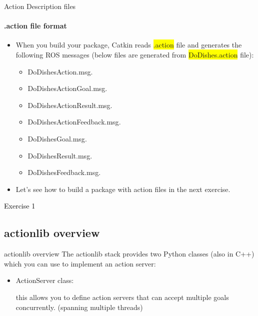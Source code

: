 \documentclass{beamer}
\begin{document}
\begin{frame}{Action Description files}
    \framesubtitle{.action file format}
    
    \begin{itemize}
    \item When you build your package, Catkin reads {\ttfamily \colorbox{yellow}{.action}} file and generates the following ROS messages {\scriptsize (below files are generated from {\ttfamily \colorbox{yellow}{DoDishes.action}} file)}:
    
    \vspace{2mm}
    
    \begin{itemize}
            \item {\ttfamily DoDishesAction.msg}.
            \item {\ttfamily DoDishesActionGoal.msg}.
            \item {\ttfamily DoDishesActionResult.msg}.
            \item {\ttfamily DoDishesActionFeedback.msg}.
            \item {\ttfamily DoDishesGoal.msg}.
            \item {\ttfamily DoDishesResult.msg}.
            \item {\ttfamily DoDishesFeedback.msg}.
    \end{itemize}
    
    \vspace{2mm}
    \item Let's see how to build a package with action files in the next exercise.
    
    \end{itemize}      
\end{frame}


\begin{frame}[plain]{}  
    \centering
    {\huge \textcolor{black}{Exercise 1}}
\end{frame}



\subsection{{\ttfamily actionlib} overview}


\begin{frame}{{\ttfamily actionlib} overview}
    The {\ttfamily actionlib} stack provides two Python classes (also in C++) which you can use to implement an action server:
    \vspace{5mm}
    \begin{itemize}
        \item {\ttfamily \color{red} ActionServer} class:
        
         this allows you to define action servers that can accept multiple goals concurrently. {\scriptsize (spanning multiple threads)}
        

    \end{itemize}      
\end{frame}
\end{document}

